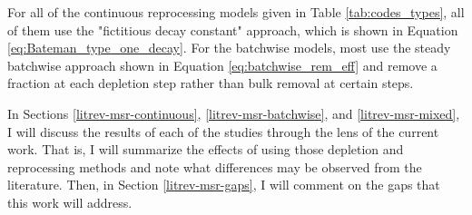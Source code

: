 For all of the continuous reprocessing models given in Table \ref{tab:codes_types}, all of them use the "fictitious decay constant" approach, which is shown in Equation \eqref{eq:Bateman_type_one_decay}. For the batchwise models, most use the steady batchwise approach shown in Equation \eqref{eq:batchwise_rem_eff} and remove a fraction at each depletion step rather than bulk removal at certain steps.




In Sections \ref{litrev-msr-continuous}, \ref{litrev-msr-batchwise}, and \ref{litrev-msr-mixed}, I will discuss the results of each of the studies through the lens of the current work. That is, I will summarize the effects of using those depletion and reprocessing methods and note what differences may be observed from the literature. Then, in Section \ref{litrev-msr-gaps}, I will comment on the gaps that this work will address.


